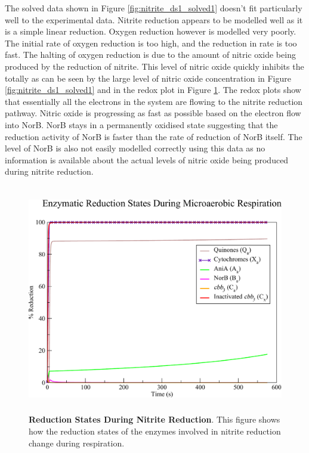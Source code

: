 The solved data shown in Figure \ref{fig:nitrite_ds1_solved1} doesn't fit particularly well to the experimental data. Nitrite reduction appears to be modelled well as it is a simple linear reduction. Oxygen reduction however is modelled very poorly. The initial rate of oxygen reduction is too high, and the reduction in rate is too fast. The halting of oxygen reduction is due to the amount of nitric oxide being produced by the reduction of nitrite. This level of nitric oxide quickly inhibits the \cbbthree{} totally as can be seen by the large level of nitric oxide concentration in Figure \ref{fig:nitrite_ds1_solved1} and in the redox plot in Figure \ref{fig:nitrite_ds1_redox1}. The redox plots show that essentially all the electrons in the system are flowing to the nitrite reduction pathway. Nitric oxide is progressing as fast as possible based on the electron flow into NorB. NorB stays in a permanently oxidised state suggesting that the reduction activity of NorB is faster than the rate of reduction of NorB itself. The level of NorB is also not easily modelled correctly using this data as no information is available about the actual levels of nitric oxide being produced during nitrite reduction.

\begin{figure}[tbp]
 \centering
 \includegraphics[height=10cm, clip=true]{./07-nitritereduction/data/dataset1redox-1.pdf}
 \caption[Reduction States During Nitrite Reduction]{{\bf Reduction States During Nitrite Reduction}. This figure shows how the reduction states of the enzymes involved in nitrite reduction change during respiration.
  \label{fig:nitrite_ds1_redox1}}
\end{figure}

